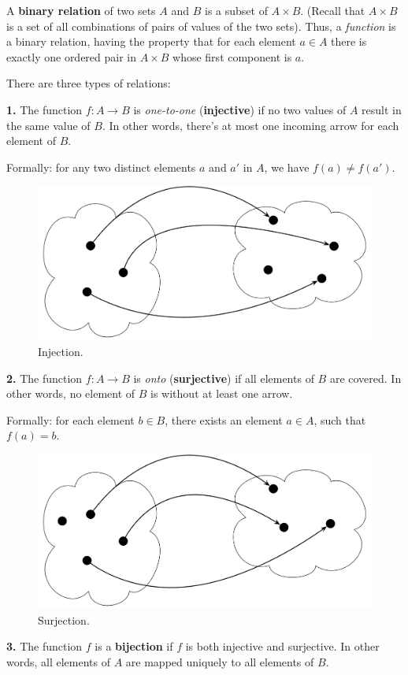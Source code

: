 \documentclass[a4paper, justified, notitlepage, sfsidenotes, notoc]{tufte-book}
\begin{document}
A \textbf{binary relation} of two sets \(A\) and \(B\) is a subset of \(A \times B\). (Recall that \(A \times B\) is a set of all combinations of pairs of values of the two sets). Thus, a \emph{function} is a binary relation, having the property that for each element \(a \in A\) there is exactly one ordered pair in \(A \times B\) whose first component is \(a\).

There are three types of relations:

\textbf{1.} The function \(f: A \rightarrow B\) is \emph{one-to-one} (\textbf{injective}) if no two values of \(A\) result in the same value of \(B\). In other words, there's at most one incoming arrow for each element of \(B\).

Formally: for any two distinct elements \(a\) and \(a'\) in \(A\), we have \(f(a) \neq f(a')\).

\begin{figure}
  \includegraphics[width=.5\linewidth,right]{images/relations/injection.png}
  \caption{Injection.}
  \label{fig:injection}
\end{figure}

\textbf{2.} The function \(f: A \rightarrow B\) is \emph{onto} (\textbf{surjective}) if all elements of \(B\) are covered. In other words, no element of \(B\) is without at least one arrow.

Formally: for each element \(b \in B\), there exists an element \(a \in A\), such that \(f(a) = b\).

\begin{figure}
  \includegraphics[width=.5\linewidth,right]{images/relations/surjection.png}
  \caption{Surjection.}
  \label{fig:surjection}
\end{figure}

\textbf{3.} The function \(f\) is a \textbf{bijection} if \(f\) is both injective and surjective. In other words, all elements of \(A\) are mapped uniquely to all elements of \(B\).
\end{document}
